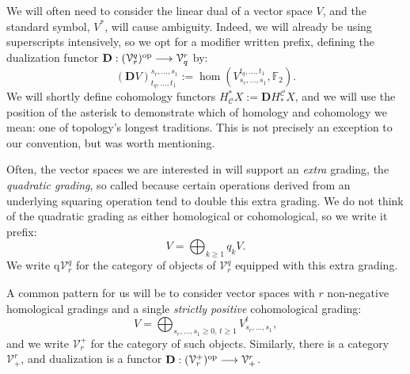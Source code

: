 \documentclass[11pt]{amsart} \renewcommand{\baselinestretch}{1.4}
\theoremstyle{plain}
\theoremstyle{definition}
\renewcommand{\to}{\longrightarrow}
\newcommand{\calV}{\mathcal{V}}
\newcommand{\calc}{\mathcal{C}}
\newcommand{\vect}[2]{\calV^{#1}_{#2}}
\newcommand{\quadgrad}[1]{\mathrm{q}_{#1}}
\newcommand{\F}{\mathbb{F}}
\newcommand{\Ftwo}{\F_2}
\newcommand{\dual}{\mathbf{D}}
\begin{document}
\begin{Conventions and notation}
We will often need to consider the linear dual of a vector space $V$, and the standard symbol, $V^*$, will cause ambiguity. Indeed, we will already be using superscripts intensively, so we opt for a modifier written prefix, defining the dualization functor
$\dual:(\vect{q}{r})^\textup{op}\to\vect{r}{q}$ by:
\[(\dual V)_{t_q,\ldots,t_1}^{s_r,\ldots,s_1}:=\hom(V^{t_q,\ldots,t_1}_{s_r,\ldots,s_1},\Ftwo ).\]
We will shortly define cohomology functors
$H_{\calc}^*X:=\dual H^{\calc}_*X$, and we will use the position of the asterisk to demonstrate which of homology and cohomology we mean: one of topology's longest traditions. This is not precisely an exception to our convention, but was worth mentioning.

Often, the vector spaces we are interested in will support an \emph{extra} grading, the \emph{quadratic grading}, so called because certain operations derived from an underlying squaring operation tend to double this extra grading. We do not think of the quadratic grading as either homological or cohomological, so we write it prefix:
\[V=\textstyle\bigoplus_{k\geq1}q_kV.\]
We write $\quadgrad{}\vect{q}{r}$ for the category of objects of $\vect{q}{r}$ equipped with this extra grading.

A common pattern for us will be to consider vector spaces with $r$ non-negative homological gradings and a single \emph{strictly positive} cohomological grading:
\[V=\bigoplus_{s_r,\ldots,s_1\geq0,\,t\geq 1}V^{t}_{s_r,\ldots,s_1},\]
and we write $\vect{+}{r}$ for the category of such objects. Similarly, there is a category $\vect{r}{+}$, and  dualization is a functor $\dual:(\vect{+}{r})^\textup{op}\to\vect{r}{+}$.



\end{Conventions and notation}
\end{document}
